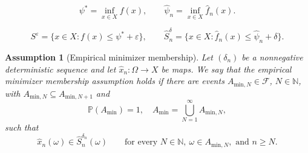 \documentclass[10pt,a4paper]{amsart}
\newtheorem{assumption}{Assumption}
\begin{document}
\begin{equation}
\psi^{*}=\inf_{x\in X}f(x),\qquad\hat{\psi}_{n}=\inf_{x\in X}\hat{f}_{n}(x).\label{eq:value-defs}
\end{equation}

\begin{equation}
S^{\varepsilon}=\{x\in X:f(x)\le\psi^{*}+\varepsilon\},\qquad\hat{S}_{n}^{\delta}=\{x\in X:\hat{f}_{n}(x)\le\hat{\psi}_{n}+\delta\}.\label{eq:near-minimizers}
\end{equation}

\begin{assumption}[Empirical minimizer membership]\label{ass:emp-min-membership}
Let $(\delta_{n})$ be a nonnegative deterministic sequence and let
$\hat{x}_{n}:\Omega\to X$ be maps. We say that the empirical minimizer
membership assumption holds if there are events $A_{\mathrm{min},N}\in\mathcal{F}$,
$N\in\mathbb{N}$, with $A_{\mathrm{min},N}\subseteq A_{\mathrm{min},N+1}$ and
\[
\mathbb{P}\left(A_\mathrm{min}\right)=1,\quad A_\mathrm{min}=\bigcup_{N=1}^{\infty}A_{\mathrm{min},N},
\]
such that
\[
\hat{x}_{n}(\omega)\in\hat{S}_{n}^{\delta_{n}}(\omega)\qquad\text{for every }N\in\mathbb{N},\ \omega\in A_{\mathrm{min},N},\text{ and }n\ge N.
\]
\end{assumption}
\end{document}
